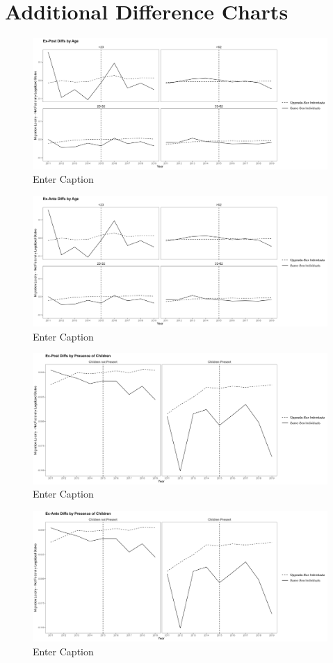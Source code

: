 \documentclass[12pt,letterpaper]{article}
\begin{document}
\newpage
\appendix
\FloatBarrier
\section{Additional Difference Charts}
\begin{figure}
    \centering
    \includegraphics[width=0.75\linewidth]{outputs/summary_stats/age_post_diffs.png}
    \caption{Enter Caption}
    \label{fig: fig:enter-label}
\end{figure}

\begin{figure}
    \centering
    \includegraphics[width=0.75\linewidth]{outputs/summary_stats/age_ante_diffs.png}
    \caption{Enter Caption}
    \label{fig: fig:enter-label}
\end{figure}


\begin{figure}
    \centering
    \includegraphics[width=0.75\linewidth]{outputs/summary_stats/child_post_diffs.png}
    \caption{Enter Caption}
    \label{fig: fig:enter-label}
\end{figure}

\begin{figure}
    \centering
    \includegraphics[width=0.75\linewidth]{outputs/summary_stats/child_ante_diffs.png}
    \caption{Enter Caption}
    \label{fig: fig:enter-label}
\end{figure}
\end{document}

